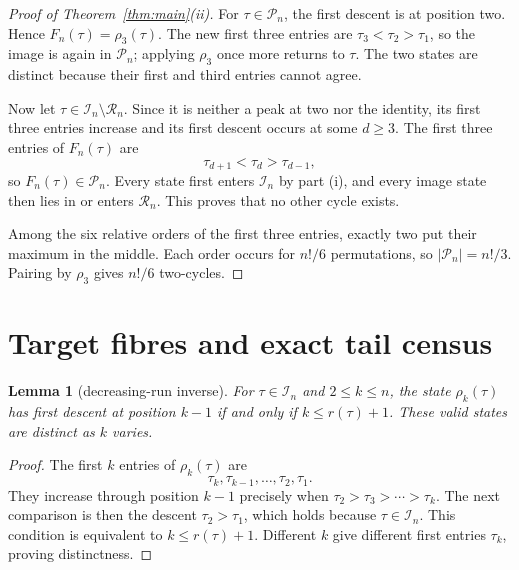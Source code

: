 \documentclass[a4paper,10pt]{amsart}
\newtheorem{lemma}[theorem]{Lemma}
\theoremstyle{remark}
\newcommand{\cI}{\mathcal I}
\newcommand{\cP}{\mathcal P}
\newcommand{\cR}{\mathcal R}
\begin{document}
\begin{proof}[Proof of Theorem~\ref{thm:main}(ii)]
For $\tau\in\cP_n$, the first descent is at position two.  Hence
$F_n(\tau)=\rho_3(\tau)$.  The new first three entries are
$\tau_3<\tau_2>\tau_1$, so the image is again in $\cP_n$; applying
$\rho_3$ once more returns to $\tau$.  The two states are distinct because
their first and third entries cannot agree.

Now let $\tau\in\cI_n\setminus\cR_n$.  Since it is neither a peak at two nor
the identity, its first three entries increase and its first descent occurs
at some $d\ge3$.  The first three entries of $F_n(\tau)$ are
\begin{equation}\label{eq:new-peak}
              \tau_{d+1}<\tau_d>\tau_{d-1},
\end{equation}
so $F_n(\tau)\in\cP_n$.  Every state first enters $\cI_n$ by part (i), and
every image state then lies in or enters $\cR_n$.  This proves that no other
cycle exists.

Among the six relative orders of the first three entries, exactly two put
their maximum in the middle.  Each order occurs for $n!/6$ permutations, so
$|\cP_n|=n!/3$.  Pairing by $\rho_3$ gives $n!/6$ two-cycles.
\end{proof}

\section{Target fibres and exact tail census}

\begin{lemma}[decreasing-run inverse]\label{lem:fibre}
For $\tau\in\cI_n$ and $2\le k\le n$, the state $\rho_k(\tau)$ has first
descent at position $k-1$ if and only if $k\le r(\tau)+1$.
These valid states are distinct as $k$ varies.
\end{lemma}

\begin{proof}
The first $k$ entries of $\rho_k(\tau)$ are
\begin{equation}\label{eq:inverse-word}
             \tau_k,\tau_{k-1},\ldots,\tau_2,\tau_1.
\end{equation}
They increase through position $k-1$ precisely when
$\tau_2>\tau_3>\cdots>\tau_k$.  The next comparison is then the descent
$\tau_2>\tau_1$, which holds because $\tau\in\cI_n$.  This condition is
equivalent to $k\le r(\tau)+1$.  Different $k$ give different first entries
$\tau_k$, proving distinctness.
\end{proof}
\end{document}
